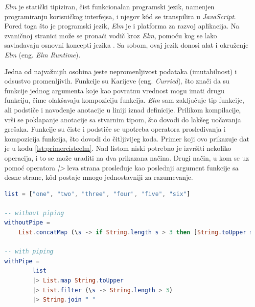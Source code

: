 \documentclass[12pt,oneside]{memoir}
\begin{document}
\par \emph{Elm} je statički tipiziran, čist funkcionalan programski jezik, namenjen programiranju korisničkog interfejsa, i njegov k\^{o}d se transpilira u \emph{JavaScript}. Pored toga što je programski jezik, \emph{Elm} je i platforma za razvoj aplikacija. Na zvaničnoj stranici može se pronaći vodič kroz \emph{Elm}, pomoću kog se lako savladavaju osnovni koncepti jezika \cite{elm-lang-official}. Sa sobom, ovaj jezik donosi alat i okruženje \emph{Elm} (eng. \emph{Elm Runtime}). 
\par Jedna od najvažnijih osobina jeste nepromenljivost podataka (imutabilnost) i odsustvo promenljivih. Funkcije su Karijeve (eng. \emph{Curried}), što znači da su funkcije jednog argumenta koje kao povratnu vrednost mogu imati drugu funkciju, čime olakšavaju kompoziciju funkcija. \emph{Elm} sam zaključuje tip funkcije, ali podstiče i navođenje anotacije u liniji iznad definicije. Prilikom kompilacije, vrši se poklapanje anotacije sa stvarnim tipom, što dovodi do lakšeg uočavanja grešaka. Funkcije su čiste i podstiče se upotreba operatora prosleđivanja i kompozicija funkcija, što dovodi do čitljivijeg koda. Primer koji ovo prikazuje dat je u kodu \ref{lst:primercisteelm}. Nad listom niski potrebno je izvršiti nekoliko operacija, i to se može uraditi na dva prikazana načina. Drugi način, u kom se uz pomoć operatora \emph{|>} leva strana prosleđuje kao poslednji argument funkcije sa desne strane, k\^{o}d postaje mnogo jednostavniji za razumevanje. 


\begin{minipage}{\linewidth}
\begin{lstlisting}[language=elm, basicstyle=\small, caption={Primer kompozicije funkcija upotrebom operatora prosleđivanja\\},captionpos=b, label={lst:primercisteelm}]
list = ["one", "two", "three", "four", "five", "six"]

-- without piping
withoutPipe =
    List.concatMap (\s -> if String.length s > 3 then [String.toUpper s] else []) list
 
-- with piping
withPipe =
        list
        |> List.map String.toUpper
        |> List.filter (\s -> String.length > 3)
        |> String.join " "

\end{lstlisting}
\end{minipage}
\end{document}
